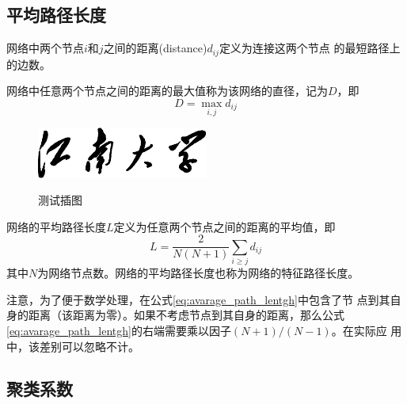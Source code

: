 \subsection{平均路径长度}

\begin{definition}[节点之间的距离]
网络中两个节点$i$和$j$之间的距离(distance)$d_{ij}$定义为连接这两个节点
的最短路径上的边数。
\end{definition}

\begin{definition}[直径]
网络中任意两个节点之间的距离的最大值称为该网络的直径，记为$D$，即
\begin{equation}\label{eq:dimension}
    D = \max_{i,j} d_{ij}
\end{equation}
\end{definition}


\begin{figure}[htbp]
  \centering
  \includegraphics[width= 0.5\textwidth]{jnuname.eps}\\
  \caption{测试插图}\label{fig:test3}
\end{figure}

\begin{definition}[平均路径长度]
网络的平均路径长度$L$定义为任意两个节点之间的距离的平均值，即
\begin{equation}\label{eq:avarage_path_lentgh}
    L = \frac{2}{N(N+1)}\sum_{i\geq j}d_{ij}
\end{equation}
其中$N$为网络节点数。网络的平均路径长度也称为网络的特征路径长度。
\end{definition}

注意，为了便于数学处理，在公式\eqref{eq:avarage_path_lentgh}中包含了节
点到其自身的距离（该距离为零）。如果不考虑节点到其自身的距离，那么公式
\eqref{eq:avarage_path_lentgh}的右端需要乘以因子$(N+1)/(N-1)$。在实际应
用中，该差别可以忽略不计。

\subsection{聚类系数}

